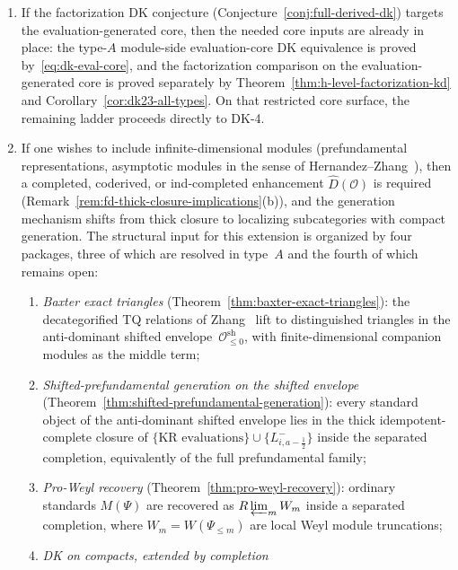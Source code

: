 \begin{remark}
\begin{enumerate}[label=\textup{(\alph*)}]
\item If the factorization DK conjecture
 \textup{(}Conjecture~\textup{\ref{conj:full-derived-dk}}\textup{)}
 targets the evaluation-generated core, then the needed core inputs
 are already in place: the type-$A$ module-side evaluation-core DK
 equivalence is proved by~\eqref{eq:dk-eval-core}, and the
 factorization comparison on the evaluation-generated core is proved
 separately by Theorem~\ref{thm:h-level-factorization-kd} and
 Corollary~\ref{cor:dk23-all-types}. On that restricted core
 surface, the remaining ladder proceeds directly to DK-4.
\item If one wishes to include infinite-dimensional
 modules \textup{(}prefundamental representations, asymptotic
 modules in the sense of Hernandez--Zhang~\cite{HJZ25}\textup{)}, then
 a completed, coderived, or ind-completed enhancement
 $\widehat{D}(\mathcal{O})$ is required
 \textup{(}Remark~\textup{\ref{rem:fd-thick-closure-implications}(b)}\textup{)},
 and the generation mechanism shifts from thick closure to
 localizing subcategories with compact generation. The
 structural input for this extension is organized by four
 packages, three of which are resolved in type~$A$ and the
 fourth of which remains open:
 \begin{enumerate}[label=\textup{(\roman*)}]
 \item \emph{Baxter exact triangles}
 \textup{(}Theorem~\textup{\ref{thm:baxter-exact-triangles}}\textup{)}:
 the decategorified TQ relations of Zhang~\cite{Zhang24}
 lift to distinguished triangles in the anti-dominant shifted
 envelope~$\mathcal{O}^{\mathrm{sh}}_{\leq 0}$, with
 finite-dimensional companion modules as the middle term;
 \item \emph{Shifted-prefundamental generation on the shifted envelope}
 \textup{(}Theorem~\textup{\ref{thm:shifted-prefundamental-generation}}\textup{)}:
 every standard object of the anti-dominant shifted envelope
 lies in the thick idempotent-complete closure of
 $\{\text{KR evaluations}\} \cup \{L^-_{i,a-\frac{1}{2}}\}$ inside the
 separated completion, equivalently of the full prefundamental family;
 \item \emph{Pro-Weyl recovery}
 \textup{(}Theorem~\textup{\ref{thm:pro-weyl-recovery}}\textup{)}:
 ordinary standards $M(\Psi)$ are recovered as
 $R\varprojlim_m W_m$ inside a separated completion, where
 $W_m = W(\Psi_{\leq m})$ are local Weyl module truncations;
 \item \emph{DK on compacts, extended by completion}

\end{enumerate}
\end{enumerate}
\end{remark}

